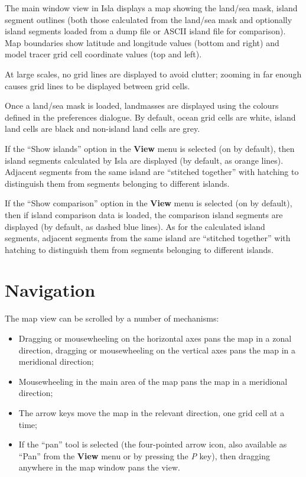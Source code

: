 \documentclass[11pt,makeidx,texhelp]{report}
\begin{document}
The main window view in Isla displays a map showing the land/sea mask,
island segment outlines (both those calculated from the land/sea mask
and optionally island segments loaded from a dump file or ASCII island
file for comparison).  Map boundaries show latitude and longitude
values (bottom and right) and model tracer grid cell coordinate values
(top and left).

At large scales, no grid lines are displayed to avoid clutter; zooming
in far enough causes grid lines to be displayed between grid cells.

Once a land/sea mask is loaded, landmasses are displayed using the
colours defined in the preferences dialogue.  By default, ocean grid
cells are white, island land cells are black and non-island land cells
are grey.

If the ``Show islands'' option in the \textbf{View} menu is selected
(on by default), then island segments calculated by Isla are displayed
(by default, as orange lines).  Adjacent segments from the same island
are ``stitched together'' with hatching to distinguish them from
segments belonging to different islands.

If the ``Show comparison'' option in the \textbf{View} menu is
selected (on by default), then if island comparison data is loaded,
the comparison island segments are displayed (by default, as dashed
blue lines).  As for the calculated island segments, adjacent segments
from the same island are ``stitched together'' with hatching to
distinguish them from segments belonging to different islands.


\section{Navigation}

The map view can be scrolled by a number of mechanisms:
\begin{itemize}
  \item{Dragging or mousewheeling on the horizontal axes pans the map
    in a zonal direction, dragging or mousewheeling on the vertical
    axes pans the map in a meridional direction;}
  \item{Mousewheeling in the main area of the map pans the map in a
    meridional direction;}
  \item{The arrow keys move the map in the relevant direction, one
    grid cell at a time;}
  \item{If the ``pan'' tool is selected (the four-pointed arrow icon,
    also available as ``Pan'' from the \textbf{View} menu or by
    pressing the \textit{P} key), then dragging anywhere in the map
    window pans the view.}
\end{itemize}
\end{document}
